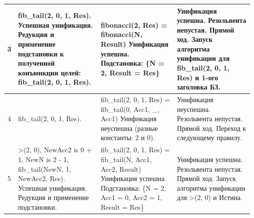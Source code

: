 \begin{tabularx}{\textwidth}{|c|>{\small}X|>{\small}X|>{\small}X|}
	3                                                                                  &
	fib\_tail(2, 0, 1, Res). \newline
	Успешная унификация. \newline
	Редукция и применение подстановки к полученной конъюнкции целей: \newline
	fib\_tail(2, 0, 1, Res).                                                           &
	fibonacci(2, Res) = \newline
	fibonacci(N, Result) \newline
	Унификация успешна. \newline
	Подстановка: \newline
	\{N = 2, Result = Res\}                                                            &
	Унификация успешна. \newline
	Резольвента непустая. \newline
	Прямой ход. \newline
	Запуск алгоритма унификации для fib\_tail(2, 0, 1, Res) и 1-ого заголовка БЗ.        \\
	\hline

	4                                                                                  &
	fib\_tail(2, 0, 1, Res).                                                           &
	fib\_tail(2, 0, 1, Res) = \newline
	fib\_tail(0, Acc1, \_, Acc1) \newline
	Унификация неуспешна (разные константы: 2 и 0).                                    &
	Унификация неуспешна. \newline
	Резольвента непустая. \newline
	Прямой ход. Переход к следующему правилу.                                            \\
	\hline

	5                                                                                  &
	>(2, 0), \newline
	NewAcc2 is 0 + 1, \newline
	NewN is 2 - 1, \newline
	fib\_tail(NewN, 1, NewAcc2, Res). \newline
	Успешная унификация. \newline
	Редукция и применение подстановки.                                                 &
	fib\_tail(2, 0, 1, Res) = \newline
	fib\_tail(N, Acc1, Acc2, Result) \newline
	Унификация успешна. \newline
	Подстановка: \newline
	\{N = 2, Acc1 = 0, Acc2 = 1, Result = Res\}                                        &
	Унификация успешна. \newline
	Резольвента непустая. \newline
	Прямой ход. \newline
	Запуск алгоритма унификации для >(2, 0) и Истина.                                    \\
	\hline


\end{tabularx}
